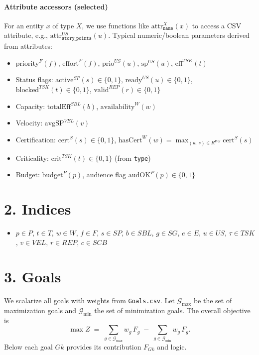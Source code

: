 \documentclass[11pt,a4paper]{article}
\begin{document}
\paragraph{Attribute accessors (selected)} For an entity $x$ of type $X$, we use functions like $\mathrm{attr}^{X}_{\texttt{name}}(x)$ to access a CSV attribute, e.g., $\mathrm{attr}^{US}_{\texttt{story\_points}}(u)$.
Typical numeric/boolean parameters derived from attributes:
\begin{itemize}[leftmargin=2em,noitemsep]
  \item $\mathrm{priority}^{F}(f)$,\; $\mathrm{effort}^{F}(f)$,\; $\mathrm{prio}^{US}(u)$,\; $\mathrm{sp}^{US}(u)$,\; $\mathrm{eff}^{TSK}(t)$
  \item Status flags: $\mathrm{active}^{SP}(s)\in\{0,1\}$,\; $\mathrm{ready}^{US}(u)\in\{0,1\}$,\; $\mathrm{blocked}^{TSK}(t)\in\{0,1\}$,\; $\mathrm{valid}^{REP}(r)\in\{0,1\}$
  \item Capacity: $\mathrm{totalEff}^{SBL}(b)$,\; $\mathrm{availability}^{W}(w)$
  \item Velocity: $\mathrm{avgSP}^{VEL}(v)$
  \item Certification: $\mathrm{cert}^{S}(s)\in\{0,1\}$,\; $\mathrm{hasCert}^{W}(w)=\max_{(w,s)\in R^{WS}}\mathrm{cert}^{S}(s)$
  \item Criticality: $\mathrm{crit}^{TSK}(t)\in\{0,1\}$ (from \texttt{type})
  \item Budget: $\mathrm{budget}^{P}(p)$,\; audience flag $\mathrm{audOK}^{P}(p)\in\{0,1\}$
\end{itemize}

\section{2. Indices}
\begin{itemize}[leftmargin=2em]
  \item $p\in P$,\; $t\in T$,\; $w\in W$,\; $f\in F$,\; $s\in SP$,\; $b\in SBL$,\; $g\in SG$,\; $e\in E$,\; $u\in US$,\; $\tau\in TSK$,\; $v\in VEL$,\; $r\in REP$,\; $c\in SCB$
\end{itemize}

\section{3. Goals}
We scalarize all goals with weights from \texttt{Goals.csv}. Let $\mathcal{G}_{\max}$ be the set of maximization goals and $\mathcal{G}_{\min}$ the set of minimization goals. The overall objective is
\[
\max Z \;=\; \sum_{g\in\mathcal{G}_{\max}} w_g\,F_g \;-\; \sum_{g\in\mathcal{G}_{\min}} w_g\,F_g.
\]
Below each goal $Gk$ provides its contribution $F_{Gk}$ and logic.
\end{document}
